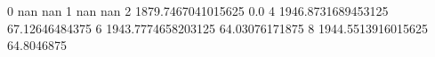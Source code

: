 0 nan nan
1 nan nan
2 1879.7467041015625 0.0
4 1946.8731689453125 67.12646484375
6 1943.7774658203125 64.03076171875
8 1944.5513916015625 64.8046875
